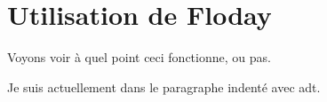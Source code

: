 \section{Utilisation de Floday}
Voyons voir à quel point ceci fonctionne, ou pas.

Je suis actuellement dans le paragraphe indenté avec \gls{adt}.
